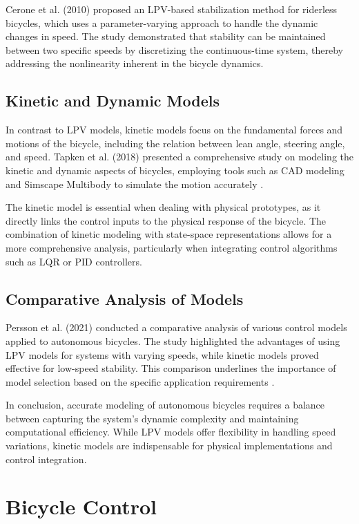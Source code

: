 	Cerone et al. (2010) proposed an LPV-based stabilization method for riderless bicycles, which uses a parameter-varying approach to handle the dynamic changes in speed. The study demonstrated that stability can be maintained between two specific speeds by discretizing the continuous-time system, thereby addressing the nonlinearity inherent in the bicycle dynamics\cite{cerone2010}.
	
	\subsection{Kinetic and Dynamic Models}
	In contrast to LPV models, kinetic models focus on the fundamental forces and motions of the bicycle, including the relation between lean angle, steering angle, and speed. Tapken et al. (2018) presented a comprehensive study on modeling the kinetic and dynamic aspects of bicycles, employing tools such as CAD modeling and Simscape Multibody to simulate the motion accurately \cite{tapken2018}.
	
	The kinetic model is essential when dealing with physical prototypes, as it directly links the control inputs to the physical response of the bicycle. The combination of kinetic modeling with state-space representations allows for a more comprehensive analysis, particularly when integrating control algorithms such as LQR or PID controllers.
	
	\subsection{Comparative Analysis of Models}
	Persson et al. (2021) conducted a comparative analysis of various control models applied to autonomous bicycles. The study highlighted the advantages of using LPV models for systems with varying speeds, while kinetic models proved effective for low-speed stability. This comparison underlines the importance of model selection based on the specific application requirements \cite{persson2021}.
	
	In conclusion, accurate modeling of autonomous bicycles requires a balance between capturing the system's dynamic complexity and maintaining computational efficiency. While LPV models offer flexibility in handling speed variations, kinetic models are indispensable for physical implementations and control integration.

\section{Bicycle Control}

